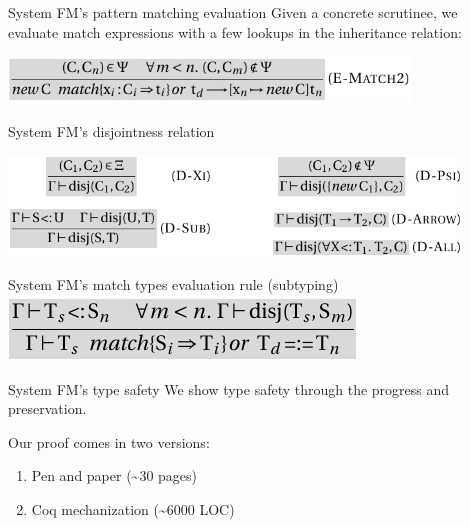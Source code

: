 \documentclass[10pt]{beamer}
\newenvironment{slide}[2][]
  {\begin{frame}[fragile,environment=slide,#1]{#2}}
  {\end{frame}}
\begin{document}
\begin{slide}{System FM's pattern matching evaluation}
Given a concrete scrutinee, we evaluate match expressions with a few lookups in the inheritance relation:
\begin{center}
\includegraphics[width=0.8\textwidth]{figures/FMEMatch.pdf}
\end{center}
\end{slide}

\begin{slide}{System FM's disjointness relation}
\begin{center}
\includegraphics[width=0.9\textwidth]{figures/FMDisjointness.pdf}
\end{center}
\end{slide}

\begin{slide}{System FM's match types evaluation rule (subtyping)}
\includegraphics[width=\textwidth]{figures/FMSMatch.pdf}
\end{slide}


\begin{slide}{System FM's type safety}
We show type safety through the progress and preservation.

Our proof comes in two versions:
\begin{enumerate}
  \item Pen and paper (\textasciitilde30 pages)
  \item Coq mechanization (\textasciitilde6000 LOC)
\end{enumerate}
\end{slide}
\end{document}
